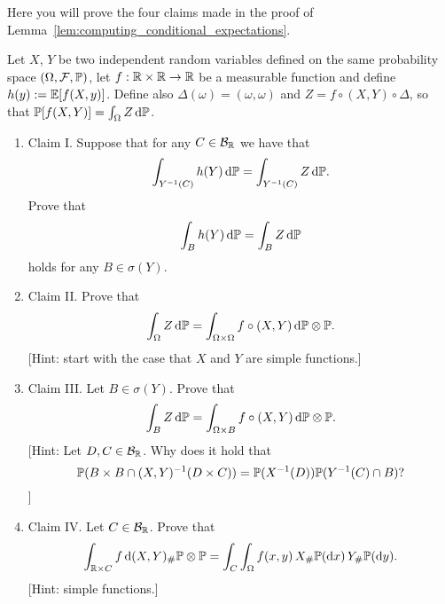 \begin{problem}\label{prb:computing_conditional_expectations}
Here you will prove the four claims made in the proof of Lemma~\ref{lem:computing_conditional_expectations}.

Let $X$, $Y$ be two independent random variables defined on the same probability space $(\Omega, \mathcal F, \mathbb P)$, let $f : \mathbb R \times \mathbb R \to \mathbb R$ be a measurable function and define $h(y) := \mathbb E[f(X,y)]$. Define also $\Delta(\omega) = (\omega, \omega)$ and $Z = f \circ (X, Y) \circ \Delta$, so that $\mathbb P[f(X,Y)] = \int_\Omega Z \, \mathrm{d} \mathbb P$.

\begin{enumerate}[label={(\alph*)}]
\item Claim I. Suppose that for any $C \in \mathcal B_{\mathbb R}$ we have that
\[
	\int_{Y^{-1}(C)} h(Y) \, \mathrm{d} \mathbb P = \int_{Y^{-1}(C)} Z \, \mathrm{d} \mathbb P.
\]
Prove that
\[
	\int_B h(Y) \, \mathrm{d} \mathbb P = \int_B Z \, \mathrm{d} \mathbb P
\]
holds for any $B \in \sigma(Y)$.
\item Claim II. Prove that
\[
	\int_\Omega Z \, \mathrm{d} \mathbb P = \int_{\Omega \times \Omega} f \circ (X,Y) \, \mathrm{d} \mathbb P \otimes \mathbb P.
\]
[Hint: start with the case that $X$ and $Y$ are simple functions.]
\item Claim III. Let $B \in \sigma(Y)$. Prove that
\[
	\int_{B} Z \, \mathrm{d} \mathbb P = \int_{\Omega \times B} f \circ (X,Y) \, \mathrm{d} \mathbb P \otimes \mathbb P.
\]
[Hint: Let $D, C \in \mathcal B_{\mathbb R}$. Why does it hold that 
\[
	\mathbb P(B \times B \cap (X,Y)^{-1}(D \times C)) = \mathbb P(X^{-1}(D))\mathbb P(Y^{-1}(C) \cap B)?
\]
]
\item Claim IV. Let $C \in \mathcal B_{\mathbb R}$. Prove that
\[
	\int_{\mathbb R \times C} f \, \mathrm{d} (X,Y)_\# \mathbb P \otimes \mathbb P
	= \int_C \int_\Omega f(x,y) \, X_\#\mathbb P(\mathrm{d} x) \, Y_\# \mathbb P (\mathrm{d} y).
\]
[Hint: simple functions.]
\end{enumerate}
\end{problem}


